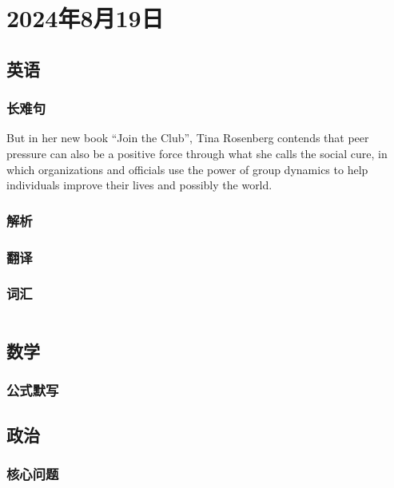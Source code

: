 \documentclass[UTF8]{ctexart}
\begin{document}
\section{2024年8月19日}
\subsection{英语}
\subsubsection{长难句}
But in her new book ``Join the Club'', Tina Rosenberg contends that peer pressure can also be a positive force through what she calls the social cure, in which organizations and officials use the power of group dynamics to help individuals improve their lives and possibly the world.
\subsubsection{解析}
\subsubsection{翻译}
\subsubsection{词汇}
\begin{table}[h]
      \centering
      \begin{tabular}{p{}p{}}
      \end{tabular}
\end{table}
\subsection{数学}
\subsubsection{公式默写}
\begin{multicols}{2}
\end{multicols}
\subsection{政治}
\subsubsection{}
\subsubsection{核心问题}
\end{document}
